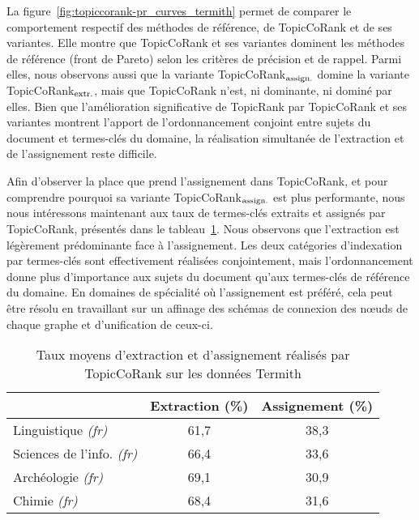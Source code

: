       La figure~\ref{fig:topiccorank-pr_curves_termith} permet de comparer le
      comportement respectif des méthodes de référence, de TopicCoRank et de
      ses variantes. Elle montre que TopicCoRank et ses variantes dominent les
      méthodes de référence (front de Pareto) selon les critères de précision
      et de rappel. Parmi elles, nous observons aussi que la variante
      TopicCoRank$_\textnormal{assign.}$ domine la variante
      TopicCoRank$_\textnormal{extr.}$, mais que TopicCoRank n'est, ni
      dominante, ni dominé par elles. Bien que l'amélioration significative de
      TopicRank par TopicCoRank et ses variantes montrent l'apport de
      l'ordonnancement conjoint entre sujets du document et termes-clés du
      domaine, la réalisation simultanée de l'extraction et de l'assignement
      reste difficile.
      

      Afin d'observer la place que prend l'assignement dans TopicCoRank, et
      pour comprendre pourquoi sa variante TopicCoRank$_\textnormal{assign.}$
      est plus performante, nous nous intéressons maintenant aux taux de
      termes-clés extraits et assignés par TopicCoRank, présentés dans le
      tableau~\ref{tab:assignment_ratio_termith}. Nous observons que
      l'extraction est légèrement prédominante face à \mbox{l'assignement}. Les deux
      catégories d'indexation par termes-clés sont effectivement réalisées
      conjointement, mais l'ordonnancement donne plus d'importance aux sujets
      du document qu'aux termes-clés de référence du domaine. En domaines de
      spécialité où l'assignement est préféré, cela peut être résolu en
      travaillant sur un affinage des schémas de connexion des n\oe{}uds de
      chaque graphe et d'unification de ceux-ci.
      \begin{table}
        \centering
        \begin{tabular}{l|c|c}
            \toprule
            & Extraction (\%) & Assignement (\%)\\
            \hline
            Linguistique \textit{(fr)} & 61,7 & 38,3\\
            Sciences de l'info. \textit{(fr)} & 66,4 & 33,6\\
            Archéologie \textit{(fr)} & 69,1 & 30,9\\
            Chimie \textit{(fr)} & 68,4 & 31,6\\
            \bottomrule
        \end{tabular}
        \caption{Taux moyens d'extraction et d'assignement réalisés par
                 TopicCoRank sur les données Termith
                 \label{tab:assignment_ratio_termith}}
      \end{table}

